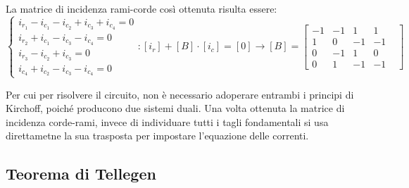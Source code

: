 \documentclass{article}
\numberwithin{equation}{subsection}
\begin{document}
La matrice di incidenza rami-corde così ottenuta risulta essere:
\begin{equation*}
    \begin{cases}
        i_{r_1}-i_{c_1}-i_{c_2}+i_{c_3}+i_{c_4}=0\\
        i_{r_2}+i_{c_1}-i_{c_3}-i_{c_4}=0\\
        i_{r_3}-i_{c_2}+i_{c_3}=0\\
        i_{c_4}+i_{c_2}-i_{c_3}-i_{c_4}=0
    \end{cases}:[i_r]+[B]\cdot[i_c]=[0]\to[B]=
    \begin{bmatrix}
        -1&-1&1&1\\
        1&0&-1&-1\\
        0&-1&1&0\\
        0&1&-1&-1&
    \end{bmatrix}
\end{equation*}

Per cui per risolvere il circuito, non è necessario adoperare entrambi i principi di Kirchoff, poiché producono due sistemi duali. Una volta ottenuta la matrice di incidenza 
corde-rami, invece di individuare tutti i tagli fondamentali si usa direttametne la sua trasposta per impostare l'equazione delle correnti. 

\subsection{Teorema di Tellegen}
\end{document}
